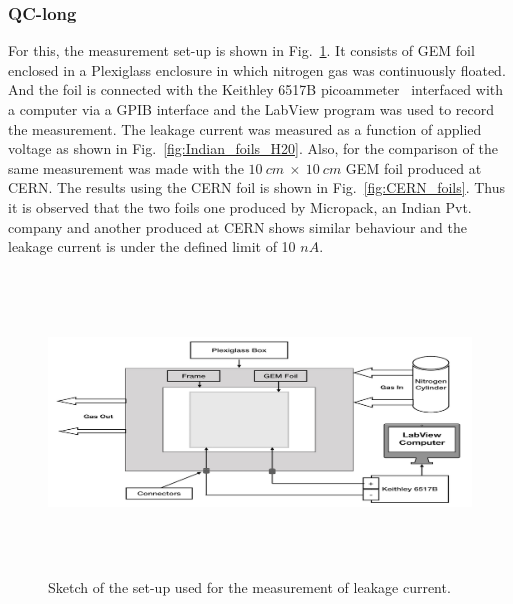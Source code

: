 \subsubsection{QC-long} %
\label{ssub:qc_long}
For this, the measurement set-up is shown in Fig.~\ref{fig:Cleaning_Measurement}. It consists of GEM foil enclosed in a Plexiglass enclosure in which nitrogen gas was continuously floated. And the foil is connected with the Keithley 6517B picoammeter~\cite{Keithley-6517B-picoammeter} interfaced with a computer via a GPIB interface and the LabView program was used to record the measurement. The leakage current was measured as a function of applied voltage as shown in Fig.~\ref{fig:Indian_foils_H20}. Also, for the comparison of the same measurement was made with the $10~cm~\times~10~cm$ GEM foil produced at CERN. The results using the CERN foil is shown in Fig.~\ref{fig:CERN_foils}. Thus it is observed that the two foils one produced by Micropack, an Indian Pvt. company and another produced at CERN shows similar behaviour and the leakage current is under the defined limit of 10 $nA$.
\begin{figure}[!htbp]
    \centering
        \includegraphics[width=12cm,height=8cm]{figures/GEM/figures/10.jpeg}
   \caption{Sketch of the set-up used for the measurement of leakage current.} \label{fig:Cleaning_Measurement}
\end{figure}
